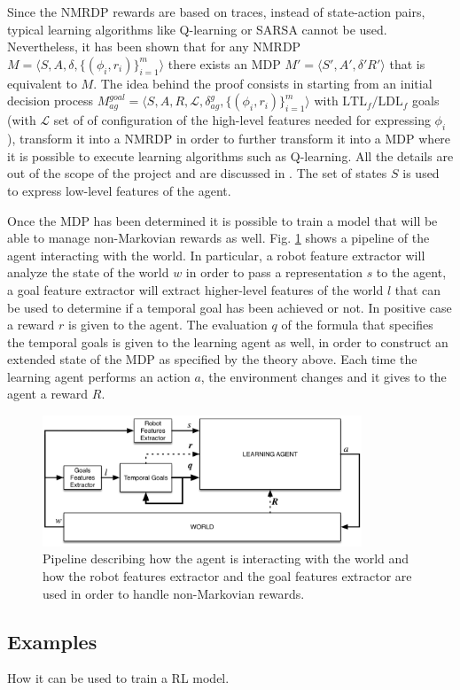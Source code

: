 Since the NMRDP rewards are based on traces, instead of state-action pairs,
typical learning algorithms like Q-learning or SARSA cannot be used.
Nevertheless, it has been shown \cite{DBLP:journals/corr/abs-1807-06333} that
for any NMRDP $M = \langle S, A, \delta, \{ (\phi_i, r_i) \}_{i=1}^m \rangle$
there exists an MDP $M' = \langle S', A', \delta' R' \rangle$ that is equivalent
to $M$. The idea behind the proof consists in starting from an initial
decision process $M_{ag}^{goal} = \langle S, A, R, \mathcal{L},
\delta_{ag}^g, \{ (\phi_i, r_i) \}_{i=1}^m \rangle$ with
$\text{LTL}_f/\text{LDL}_f$ goals (with $\mathcal{L}$ set of of configuration
of the high-level features needed for expressing $\phi_i$),
transform it into a NMRDP in order to
further transform it into a MDP where it is possible to execute learning
algorithms such as Q-learning. All the details are out of the scope of the
project and are discussed in \cite{DBLP:journals/corr/abs-1807-06333}. The
set of states $S$ is used to express low-level features of the agent.

Once the MDP has been determined it is possible to train a model that will
be able to manage non-Markovian rewards as well. Fig.
\ref{fig:rl-temporalgoals-pipeline} shows a pipeline of the
agent interacting with the world. In particular, a robot feature extractor
will analyze the state of the world $w$ in order to pass a representation $s$ to the
agent, a goal feature extractor will extract higher-level features of the world
$l$
that can be used to determine if a temporal goal has been achieved or not. In
positive case a reward $r$ is given to the agent. The evaluation $q$ of the formula
that specifies the temporal goals is given to the learning agent as well, in
order to construct an extended state of the MDP as specified by the theory above.
Each time the learning agent performs an action $a$, the environment changes
and it gives to the agent a reward $R$.
\begin{figure}
    \centering
    \includegraphics[width=0.85\textwidth]{images/rl-temporalgoals-pipeline.png}
    \caption{Pipeline describing how the agent is interacting with the
        world and how the robot features extractor and the goal features
        extractor are used in order to handle non-Markovian rewards.}
    \label{fig:rl-temporalgoals-pipeline}
\end{figure}

\subsection{Examples}
How it can be used to train a RL model.

